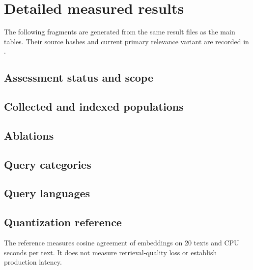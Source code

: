 \clearpage
\section{Detailed measured results}
The following fragments are generated from the same result files as the main tables. Their source hashes and current primary relevance variant are recorded in .
\subsection{Assessment status and scope}

\subsection{Collected and indexed populations}

\clearpage
\subsection{Ablations}

\clearpage
\subsection{Query categories}

\clearpage
\subsection{Query languages}

\subsection{Quantization reference}
The reference measures cosine agreement of embeddings on 20 texts and CPU seconds per text. It does not measure retrieval-quality loss or establish production latency.
\par\medskip

\par
